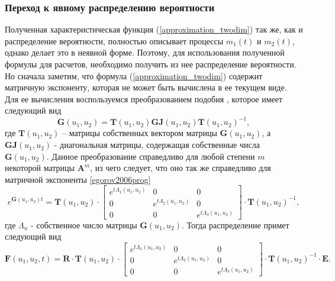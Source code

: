 \subsubsection{Переход к явному распределению вероятности}
Полученная характеристическая функция (\ref{approximation_twodim}) так же, как и распределение вероятности, полностью описывает процессы $m_{1}(t)$ и $m_{2}(t)$, однако делает это в неявной форме. Поэтому, для использования полученной формулы для расчетов, необходимо получить из нее распределение вероятности.
Но сначала заметим, что формула (\ref{approximation_twodim}) содержит матричную экспоненту, которая не может быть вычислена в ее текущем виде. Для ее вычисления воспользуемся преобразованием подобия \cite{bronson1991matrix}, которое имеет следующий вид
\begin{equation*}
	\boldsymbol{G}(u_{1},u_{2}) =\boldsymbol{T}(u_{1},u_{2})\boldsymbol{GJ}(u_{1},u_{2})\boldsymbol{T}(u_{1},u_{2})^{-1},
\end{equation*}
где $\boldsymbol{T}(u_{1},u_{2})$ – матрицы собственных вектором матрицы $\boldsymbol{G}(u_{1},u_{2})$, а $\boldsymbol{GJ}(u_{1},u_{2})$ - диагональная матрицы, содержащая собственные числа $\boldsymbol{G}(u_{1},u_{2})$. Данное преобразование справедливо для любой степени $m$ некоторой матрицы $\boldsymbol{A}^{m}$, из чего следует, что оно так же справедливо для матричной экспоненты \ref{egorov2006prog}
\begin{equation*}
	e^{\boldsymbol{G}(u_{1},u_{2})t}=\boldsymbol{T}(u_{1},u_{2})\cdot \begin{bmatrix}
		e^{t \Lambda_{1}(u_{1},u_{2})} & 0 &  0\\
		0 & e^{t \Lambda_{2}(u_{1},u_{2})} & 0\\
		0 & 0 &	e^{t \Lambda_{3}(u_{1},u_{2})}
	\end{bmatrix} \cdot \boldsymbol{T}(u_{1},u_{2})^{-1},
\end{equation*}
где $\Lambda_{n}$ - собственное число матрицы $\boldsymbol{G}(u_{1},u_{2})$. Тогда распределение примет следующий вид
\begin{equation*}
	\boldsymbol{F}(u_{1},u_{2},t)=\boldsymbol{R} \cdot \boldsymbol{T}(u_{1},u_{2})\cdot \begin{bmatrix}
		e^{t \Lambda_{1}(u_{1},u_{2})} & 0 &  0\\
		0 & e^{t \Lambda_{2}(u_{1},u_{2})} & 0\\
		0 & 0 &	e^{t \Lambda_{3}(u_{1},u_{2})}
	\end{bmatrix} \cdot \boldsymbol{T}(u_{1},u_{2})^{-1} \cdot \boldsymbol{E}.
\end{equation*}
